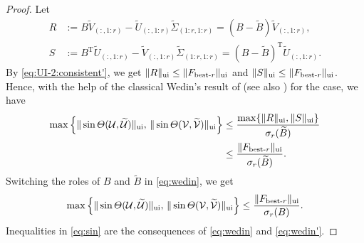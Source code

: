 \documentclass[11pt]{article}
\def\cU{{\cal U}}
\def\cV{{\cal V}}
\DeclareMathOperator{\T}{T}
\DeclareMathOperator{\UI}{ui}
\def\wtd{\widetilde}
\def\bestr{\mbox{\scriptsize\rm best-$r$}}
\theoremstyle{definition}
\numberwithin{equation}{section}
\numberwithin{figure}{section}
\numberwithin{table}{section}
\begin{document}
\begin{proof}
Let
\begin{align*}
R&:=B\wtd V_{(:,1:r)}-\wtd U_{(:,1:r)}\wtd\Sigma_{(1:r,1:r)}=(B-\wtd B)\wtd V_{(:,1:r)},\\
S&:=B^{\T}\wtd U_{(:,1:r)}-\wtd V_{(:,1:r)}\wtd\Sigma_{(1:r,1:r)}=(B-\wtd B)^{\T}\wtd U_{(:,1:r)}.
\end{align*}
By \eqref{eq:UI-2:consistent'}, we get
$\|R\|_{\UI}\le\|F_{\bestr}\|_{\UI}$ and $\|S\|_{\UI}\le\|F_{\bestr}\|_{\UI}$.
Hence, with the help of the classical Wedin's result of \cite[(3.1)]{wedi:1972} (see also \cite[Fact 4, p.21-7]{li:2014HLA})
for the case, we have
\begin{align}
\max\left\{\|\sin\Theta(\cU,\wtd\cU)\|_{\UI},\,\|\sin\Theta(\cV,\wtd\cV)\|_{\UI}\right\}
  &\le\frac{\max\{\|R\|_{\UI},\|S\|_{\UI}\}}{\sigma_r(\wtd B)} \nonumber \\
  &\le\frac{\|F_{\bestr}\|_{\UI}}{\sigma_r(\wtd B)}. \label{eq:wedin}
\end{align}
Switching the roles of $B$ and $\wtd B$ in \eqref{eq:wedin}, we get
\begin{equation}\label{eq:wedin'}
\max\left\{\|\sin\Theta(\cU,\wtd\cU)\|_{\UI},\,\|\sin\Theta(\cV,\wtd\cV)\|_{\UI}\right\}
\le\frac{\|F_{\bestr}\|_{\UI}}{\sigma_r(B)}.
\end{equation}
Inequalities in \eqref{eq:sin} are the consequences of \eqref{eq:wedin} and \eqref{eq:wedin'}.
%

\end{proof}
\end{document}

